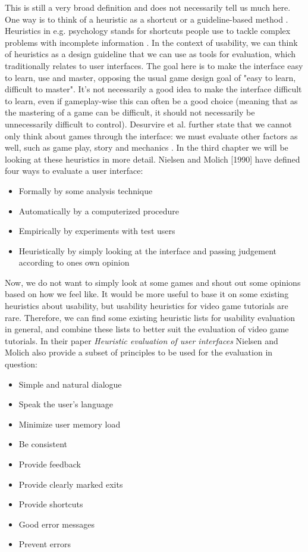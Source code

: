 This is still a very broad definition and does not necessarily tell us much here. One way is to think of a heuristic as a shortcut or a guideline-based method \cite{Isbister2008}. Heuristics in e.g. psychology stands for shortcuts people use to tackle complex problems with incomplete information \cite{Kahneman1982}. In the context of usability, we can think of heuristics as a design guideline that we can use as tools for evaluation, which traditionally relates to user interfaces. The goal here is to make the interface easy to learn, use and master, opposing the usual game design goal of "easy to learn, difficult to master". \cite{Desurvire2004} It's not necessarily a good idea to make the interface difficult to learn, even if gameplay-wise this can often be a good choice (meaning that as the mastering of a game can be difficult, it should not necessarily be unnecessarily difficult to control). Desurvire et al. further state that we cannot only think about games through the interface: we must evaluate other factors as well, such as game play, story and mechanics \cite{Desurvire2004}. In the third chapter we will be looking at these heuristics in more detail. Nielsen and Molich [1990] have defined four ways to evaluate a user interface: 

\begin{itemize}
\item Formally by some analysis technique
\item Automatically by a computerized procedure
\item Empirically by experiments with test users 
\item Heuristically by simply looking at the interface and passing judgement according to ones own opinion
\end{itemize}

Now, we do not want to simply look at some games and shout out some opinions based on how we feel like. It would be more useful to base it on some existing heuristics about usability, but usability heuristics for video game tutorials are rare. Therefore, we can find some existing heuristic lists for usability evaluation in general, and combine these lists to better suit the evaluation of video game tutorials. In their paper \textit{Heuristic evaluation of user interfaces} Nielsen and Molich also provide a subset of principles to be used for the evaluation in question: \cite{Nielsen1990}

\begin{itemize}
	\item Simple and natural dialogue
	\item Speak the user's language
	\item Minimize user memory load
	\item Be consistent
	\item Provide feedback
	\item Provide clearly marked exits
	\item Provide shortcuts
	\item Good error messages
	\item Prevent errors
\end{itemize}

